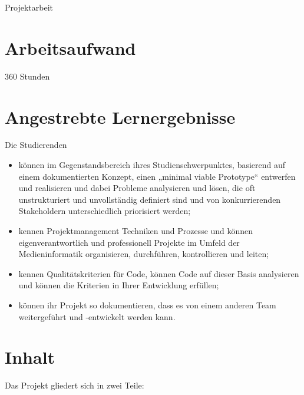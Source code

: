 Projektarbeit

\section*{Arbeitsaufwand\label{/mi-2017/modulbeschreibungen-master/MA_Modul_Projekt_Entwicklung}}\label{arbeitsaufwandpathlabelmi-2017modulbeschreibungen-mastermaux5fmodulux5fprojektux5fentwicklung}

360 Stunden

\section*{Angestrebte
Lernergebnisse\label{/mi-2017/modulbeschreibungen-master/MA_Modul_Projekt_Entwicklung}}\label{angestrebte-lernergebnissepathlabelmi-2017modulbeschreibungen-mastermaux5fmodulux5fprojektux5fentwicklung}

Die Studierenden

\begin{itemize}
\tightlist
\item
  können im Gegenstandsbereich ihres Studienschwerpunktes, basierend auf
  einem dokumentierten Konzept, einen „minimal viable Prototype``
  entwerfen und realisieren und dabei Probleme analysieren und lösen,
  die oft unstrukturiert und unvollständig definiert sind und von
  konkurrierenden Stakeholdern unterschiedlich priorisiert werden;
\item
  kennen Projektmanagement Techniken und Prozesse und können
  eigenverantwortlich und professionell Projekte im Umfeld der
  Medieninformatik organisieren, durchführen, kontrollieren und leiten;
\item
  kennen Qualitätskriterien für Code, können Code auf dieser Basis
  analysieren und können die Kriterien in Ihrer Entwicklung erfüllen;
\item
  können ihr Projekt so dokumentieren, dass es von einem anderen Team
  weitergeführt und -entwickelt werden kann.
\end{itemize}

\section*{Inhalt\label{/mi-2017/modulbeschreibungen-master/MA_Modul_Projekt_Entwicklung}}\label{inhaltpathlabelmi-2017modulbeschreibungen-mastermaux5fmodulux5fprojektux5fentwicklung}

Das Projekt gliedert sich in zwei Teile:

